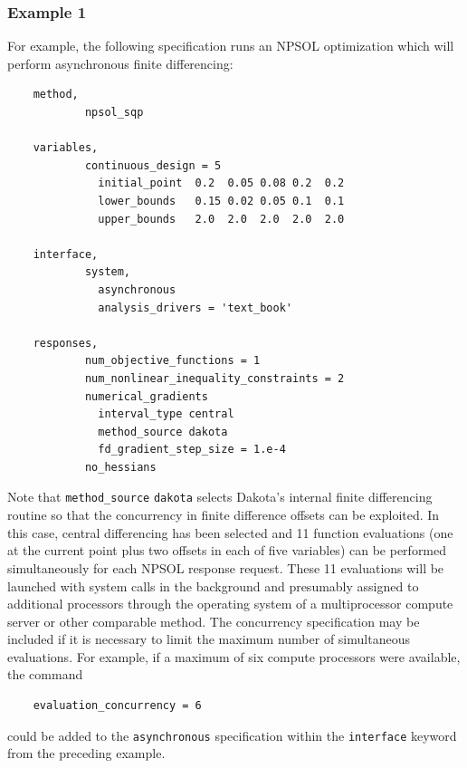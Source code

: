 \subsubsection{Example 1}\label{parallel:spec:single:example1}

For example, the following specification runs an NPSOL optimization
which will perform asynchronous finite differencing:
\begin{small}
\begin{verbatim}
    method,
            npsol_sqp

    variables,
            continuous_design = 5
              initial_point  0.2  0.05 0.08 0.2  0.2
              lower_bounds   0.15 0.02 0.05 0.1  0.1
              upper_bounds   2.0  2.0  2.0  2.0  2.0

    interface,
            system,
              asynchronous
              analysis_drivers = 'text_book'

    responses,
            num_objective_functions = 1
            num_nonlinear_inequality_constraints = 2
            numerical_gradients
              interval_type central
              method_source dakota
              fd_gradient_step_size = 1.e-4
            no_hessians
\end{verbatim}
\end{small}

Note that \texttt{method\_source} \texttt{dakota} selects Dakota's
internal finite differencing routine so that the concurrency in finite
difference offsets can be exploited. In this case, central
differencing has been selected and 11 function evaluations (one at the
current point plus two offsets in each of five variables) can be
performed simultaneously for each NPSOL response request. These 11
evaluations will be launched with system calls in the background and
presumably assigned to additional processors through the operating
system of a multiprocessor compute server or other comparable method.
The concurrency specification may be included if it is necessary to
limit the maximum number of simultaneous evaluations. For example, if
a maximum of six compute processors were available, the command
\begin{small}
\begin{verbatim}
    evaluation_concurrency = 6
\end{verbatim}
\end{small}
could be added to the \texttt{asynchronous} specification within the
\texttt{interface} keyword from the preceding example.

